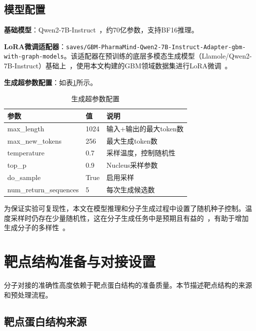 \subsection{模型配置}\label{sec:model-config}

\textbf{基础模型}：Qwen2-7B-Instruct~\cite{Qwen2Team2024}，约70亿参数，支持BF16推理。

\textbf{LoRA微调适配器}：\texttt{saves/GBM-PharmaMind-Qwen2-7B-Instruct-Adapter-gbm-with-graph-models}。该适配器在预训练的底层多模态生成模型（Llamole/Qwen2-7B-Instruct）基础上~\cite{liu2025multimodal}，使用本文构建的GBM领域数据集进行LoRA微调~\cite{hu2022lora}。

\textbf{生成超参数配置}：如表\ref{tab:gen-params}所示。

\begin{table}[htbp]
    \centering
    \caption{生成超参数配置}\label{tab:gen-params}
    \begin{tabular}{lll}
        \toprule
        \textbf{参数} & \textbf{值} & \textbf{说明} \\
        \midrule
        max\_length & 1024 & 输入+输出的最大token数 \\
        max\_new\_tokens & 256 & 最大生成token数 \\
        temperature & 0.7 & 采样温度，控制随机性 \\
        top\_p & 0.9 & Nucleus采样参数 \\
        do\_sample & True & 启用采样 \\
        num\_return\_sequences & 5 & 每次生成候选数 \\
        \bottomrule
    \end{tabular}
\end{table}

为保证实验可复现性，本文在模型推理和分子生成过程中设置了随机种子控制。温度采样时仍存在少量随机性，这在分子生成任务中是预期且有益的~\cite{Bagal2021}，有助于增加生成分子的多样性~\cite{Zhou2019Exp}。

\section{靶点结构准备与对接设置}\label{sec:target-prep}

分子对接的准确性高度依赖于靶点蛋白结构的准备质量。本节描述靶点结构的来源和预处理流程。

\subsection{靶点蛋白结构来源}\label{sec:protein-source}

